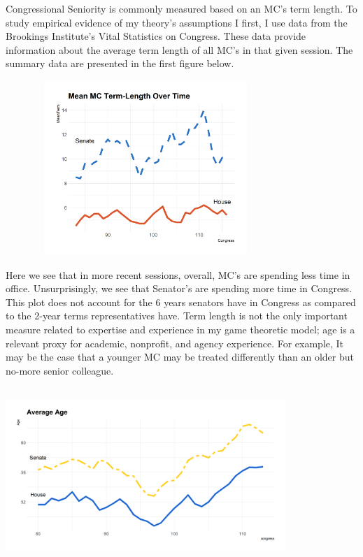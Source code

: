 \documentclass [12pt]{article}
\begin{document}
Congressional Seniority is commonly measured based on an MC's term length. To study empirical evidence of my theory's assumptions I first, I use data from the Brookings Institute's Vital Statistics on Congress. These data provide information about the average term length of all MC's in that given session. The summary data are presented in the first figure below.

\includegraphics[height=250, width=400]{../figures/term-time-plot.png}

Here we see that in more recent sessions, overall, MC's are spending less time in office. Unsurprisingly, we see that Senator's are spending more time in Congress. This plot does not account for the 6 years senators have in Congress as compared to the 2-year terms representatives have. Term length is not the only important measure related to expertise and experience in my game theoretic model; age is a relevant proxy for academic, nonprofit, and agency experience. For example, It may be the case that a younger MC may be treated differently than an older but no-more senior colleague. 

\includegraphics[height=250, width=400]{../figures/age-over-time}
\end{document}
